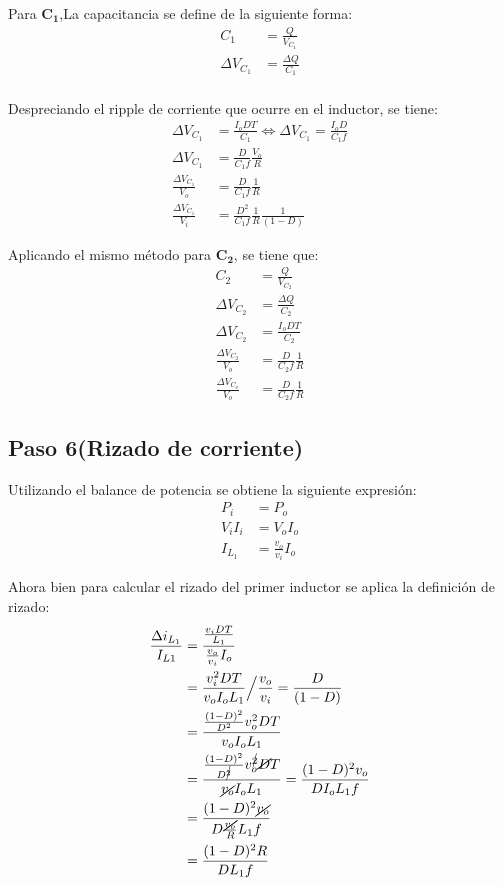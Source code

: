 Para $\mathbf{C_1}$,La capacitancia se define de la siguiente forma:
\begin{align*}
    C_1&=\frac{Q}{V_{C_1}} \\ 
    \Delta V_{C_1} &= \frac{\Delta Q}{C_1} \\ 
\end{align*}

Despreciando el ripple de corriente que ocurre en el inductor, se tiene:
\begin{align*}
    \Delta V_{C_1}&= \frac{I_oDT}{C_1} \iff \Delta V_{C_1}= \frac{I_oD}{C_1 f} \\ 
    \Delta V_{C_1}&= \frac{D}{C_1 f}\frac{V_o}{R} \\ 
    \frac{\Delta V_{C_1}}{V_o}&= \frac{D}{C_1 f}\frac{1}{R} \\ 
    \frac{\Delta V_{C_1}}{V_i}&= \frac{D^2}{C_1 f}\frac{1}{R}\frac{1}{(1-D)}
\end{align*}

Aplicando el mismo método para $\mathbf{C_2}$, se tiene que: 
\begin{align*}
    C_2&=\frac{Q}{V_{C_2}} \\ 
    \Delta V_{C_2}&= \frac{\Delta Q}{C_2} \\ 
    \Delta V_{C_2}&= \frac{I_oDT}{C_2} \\ 
    \frac{\Delta V_{C_2}}{V_o}&= \frac{D}{C_2f}\frac{1}{R} \\ 
    \frac{\Delta V_{C_o}}{V_o}&= \frac{D}{C_2f}\frac{1}{R}
\end{align*}

\newpage
\subsection{Paso 6(Rizado de corriente)}

Utilizando el balance de potencia se obtiene la siguiente expresión:
\begin{align*}
    P_i&=P_o \\ 
    V_iI_i&=V_oI_o \\ 
    I_{L_1}&=\frac{v_o}{v_i}I_o 
\end{align*}

Ahora bien para calcular el rizado del primer inductor se aplica la definición de rizado:
\begin{align*}
    \frac{\Delta i_{L_1}}{I_{L1}}&=\frac{\frac{v_iDT}{L_1}}{\frac{v_o}{v_i}I_o} \\ 
    &=\frac{v_i^2DT}{v_o I_o L_1} \Big/ \frac{v_o}{v_i}=\frac{D}{(1-D)} \\ 
    &=\frac{\frac{(1-D)^2}{D^2}v_o^2 DT}{v_o I_o L_1} \\ 
    &=\frac{\frac{(1-D)^{2}}{D^{\cancel{2}}}v_o^{\cancel{2}} \cancel{D}T}{\cancel{v_o} I_o L_1}=\frac{(1-D)^2v_o}{D I_o L_1 f} \\ 
    &=\frac{(1-D)^2\cancel{v_o}}{D \frac{\cancel{v_o}}{R} L_1 f} \\ 
    &=\frac{(1-D)^2 R}{D  L_1 f} \\ 
\end{align*}

